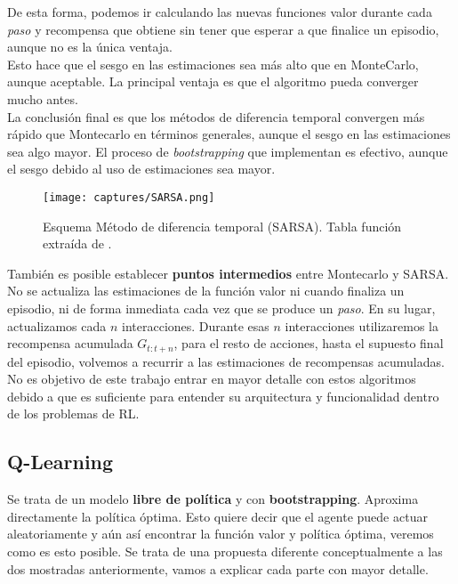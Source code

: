 \documentclass[11pt,fleqn]{book} %
\begin{document}
De esta forma, podemos ir calculando las nuevas funciones valor durante cada \textit{paso} y recompensa que obtiene sin tener que esperar a que finalice un episodio, aunque no es la única ventaja. \\

Esto hace que el sesgo en las estimaciones sea más alto que en MonteCarlo, aunque aceptable. La principal ventaja es que el algoritmo pueda converger mucho antes. \cite{article:DQN2} \\

La conclusión final es que los métodos de diferencia temporal convergen más rápido que Montecarlo en términos generales, aunque el sesgo en las estimaciones sea algo mayor. El proceso de \textit{bootstrapping} que implementan es efectivo, aunque el sesgo debido al uso de estimaciones sea mayor. \\ 

\begin{figure}[H]
	\centering\texttt{[image: captures/SARSA.png]}
	\caption{Esquema Método de diferencia temporal (SARSA). Tabla función extraída de \cite{article:RLromero}.}
	\label{fig:SARSA} %
\end{figure}

También es posible establecer \textbf{puntos intermedios} entre Montecarlo y SARSA. No se actualiza las estimaciones de la función valor ni cuando finaliza un episodio, ni de forma inmediata cada vez que se produce un \textit{paso}. En su lugar, actualizamos cada $n$ interacciones. Durante esas $n$ interacciones utilizaremos la recompensa acumulada $G_{t:t+n}$, para el resto de acciones, hasta el supuesto final del episodio, volvemos a recurrir a las estimaciones de recompensas acumuladas. \\

No es objetivo de este trabajo entrar en mayor detalle con estos algoritmos debido a que es suficiente para entender su arquitectura y funcionalidad dentro de los problemas de RL. \\

\subsection{Q-Learning}\label{sec:qlearning}

Se trata de un modelo \textbf{libre de política} y con \textbf{bootstrapping}. Aproxima directamente la política óptima. Esto quiere decir que el agente puede actuar aleatoriamente y aún así encontrar la función valor y política óptima, veremos como es esto posible. Se trata de una propuesta diferente conceptualmente a las dos mostradas anteriormente, vamos a explicar cada parte con mayor detalle. \\
\end{document}

